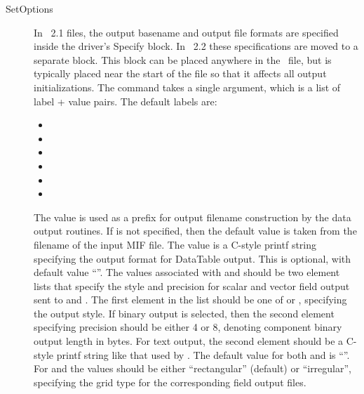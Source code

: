 \begin{description}
\item[SetOptions\label{html:mif2SetOptions}]
In \MIF~2.1 files, the output basename and output file formats are
specified inside the driver's Specify block.  In \MIF~2.2 these
specifications are moved to a separate  block.  This
block can be placed anywhere in the \MIF\ file, but is typically placed
near the start of the file so that it affects all output
initializations.  The  command takes a single argument,
which is a list of label + value pairs.  The default labels are:
\begin{itemize}
\item {}
\item {}
\item {}
\item {}
\item {}
\item {}
\end{itemize}
The  value is used as a prefix for output filename
construction by the data output routines.  If  is not
specified, then the default value is taken from the filename of the
input MIF file.  The  value is a C-style
printf string specifying
the output format for DataTable output.  This is
optional, with default value ``''.  The values associated with
 and
 should be two element lists
that specify the style and precision for scalar and vector field
output sent to  and
.  The first
element in the list should be one of  or , specifying
the output style.  If binary output is selected, then the second element
specifying precision should be either 4 or 8, denoting component binary
output length in bytes.  For text output, the
second element should be a C-style printf string like that used by
.  The default value for both
 and
 is ``''.
For  and
 the values should be either
``rectangular'' (default) or ``irregular'', specifying the grid type for
the corresponding field output files.


\end{description}
